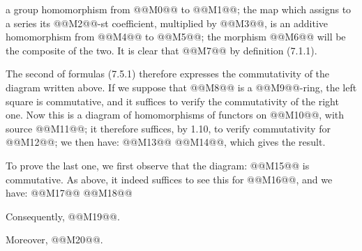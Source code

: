 a group homomorphism from @@M0@@ to @@M1@@; the map which assigns to a series its @@M2@@-st coefficient, multiplied by @@M3@@, is an additive homomorphism from @@M4@@ to @@M5@@; the morphism @@M6@@ will be the composite of the two. It is clear that @@M7@@ by definition (7.1.1).

The second of formulas (7.5.1) therefore expresses the commutativity of the diagram written above. If we suppose that @@M8@@ is a @@M9@@-ring, the left square is commutative, and it suffices to verify the commutativity of the right one. Now this is a diagram of homomorphisms of functors on @@M10@@, with source @@M11@@; it therefore suffices, by 1.10, to verify commutativity for @@M12@@; we then have:
@@M13@@
@@M14@@, which gives the result.

To prove the last one, we first observe that the diagram:
@@M15@@
is commutative. As above, it indeed suffices to see this for @@M16@@, and we have:
@@M17@@
@@M18@@

Consequently, @@M19@@.

Moreover, @@M20@@.

